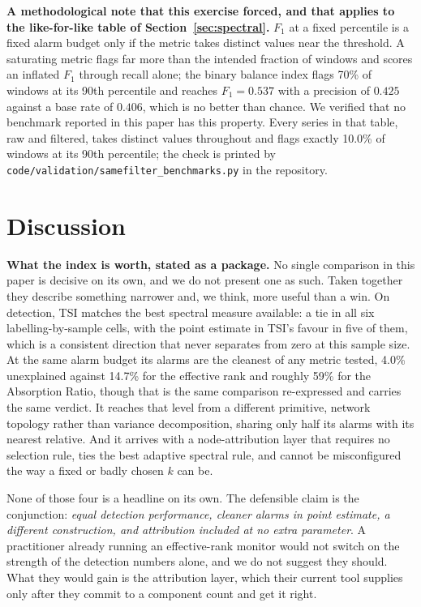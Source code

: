 \documentclass[11pt,a4paper]{article}
\begin{document}
\textbf{A methodological note that this exercise forced, and that applies to
the like-for-like table of Section~\ref{sec:spectral}.} $F_1$ at a fixed percentile is a fixed alarm
budget only if the metric takes distinct values near the threshold. A saturating
metric flags far more than the intended fraction of windows and scores an
inflated $F_1$ through recall alone; the binary balance index flags 70\% of
windows at its 90th percentile and reaches $F_1 = 0.537$ with a precision of
$0.425$ against a base rate of $0.406$, which is no better than chance. We
verified that no benchmark reported in this paper has this property. Every
series in that table, raw and filtered, takes distinct values throughout and
flags exactly 10.0\% of windows at its 90th percentile; the check is printed by
\texttt{code/validation/samefilter\_benchmarks.py} in the repository.


\section{Discussion}

\textbf{What the index is worth, stated as a package.} No single comparison in
this paper is decisive on its own, and we do not present one as such. Taken
together they describe something narrower and, we think, more useful than a
win. On detection, TSI matches the best spectral measure available: a tie
in all six labelling-by-sample cells, with the point estimate in TSI's
favour in five of them, which is a consistent direction that never separates
from zero at this sample size. At the same alarm budget its alarms are the
cleanest of any metric tested, 4.0\% unexplained against 14.7\% for the
effective rank and roughly 59\% for the Absorption Ratio, though that is the
same comparison re-expressed and carries the same verdict. It reaches that
level from a different primitive, network topology rather than variance
decomposition, sharing only half its alarms with its nearest relative. And it
arrives with a node-attribution layer that requires no selection rule, ties the
best adaptive spectral rule, and cannot be misconfigured the way a fixed or
badly chosen $k$ can be.

None of those four is a headline on its own. The defensible claim is the
conjunction: \emph{equal detection performance, cleaner alarms in point
estimate, a different construction, and attribution included at no extra
parameter}. A practitioner already running an effective-rank monitor would not
switch on the strength of the detection numbers alone, and we do not suggest
they should. What they would gain is the attribution layer, which their current
tool supplies only after they commit to a component count and get it right.
\end{document}
